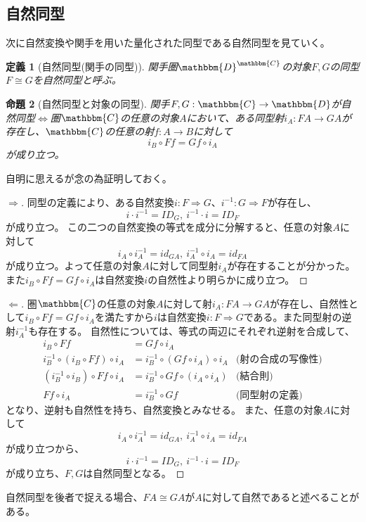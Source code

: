 \documentclass[uplatex,dvipdfmx]{jsarticle}
\newcommand{\cat}[1]{\mathbbm{#1}}
\newcommand{\arrow}{\rightarrow}
\newcommand{\functor}[3]{#1:\cat{#2}\arrow \cat{#3}}
\newcommand{\nat}[3]{#1:#2\Rightarrow #3}
\newcommand{\mor}[3]{#1:#2\arrow #3}
\newcommand{\funccat}[2]{\cat{#2}^\cat{#1}}
\newtheorem{proof}{証明}[section]
\newtheorem{prop}[proof]{命題}
\newtheorem{define}[proof]{定義}
\numberwithin{proof}{subsection}
\begin{document}
	\subsection{自然同型}
  次に自然変換や関手を用いた量化された同型である自然同型を見ていく。
  \begin{define}[自然同型(関手の同型)]
    関手圏$\funccat{C}{D}$の対象$F,G$の同型$F\cong G$を自然同型と呼ぶ。
  \end{define}
  \begin{prop}[自然同型と対象の同型]
    関手$\functor{F,G}{C}{D}$が自然同型$\iff$圏$\cat{C}$の任意の対象$A$において、ある同型射$\mor{i_A}{FA}{GA}$が存在し、$\cat{C}$の任意の射$\mor{f}{A}{B}$に対して\[i_B\circ Ff=Gf\circ i_A\]が成り立つ。
  \end{prop}
  自明に思えるが念の為証明しておく。
  \begin{proof}[$\Longrightarrow$]
    同型の定義により、ある自然変換$\nat{i}{F}{G}$、$\nat{i^{-1}}{G}{F}$が存在し、\[i\cdot i^{-1}=ID_G,\ i^{-1}\cdot i=ID_F\]が成り立つ。
    この二つの自然変換の等式を成分に分解すると、任意の対象$A$に対して\[i_A\circ i^{-1}_A=id_{GA},\ i^{-1}_A\circ i_A=id_{FA}\]が成り立つ。よって任意の対象$A$に対して同型射$i_A$が存在することが分かった。
    また$i_B\circ Ff=Gf\circ i_A$は自然変換$i$の自然性より明らかに成り立つ。
  \end{proof}
  \begin{proof}[$\Longleftarrow$]
    圏$\cat{C}$の任意の対象$A$に対して射$\mor{i_A}{FA}{GA}$が存在し、自然性として$i_B\circ Ff=Gf\circ i_A$を満たすから$i$は自然変換$\nat{i}{F}{G}$である。また同型射の逆射$i^{-1}_A$も存在する。
    自然性については、等式の両辺にそれぞれ逆射を合成して、
    \begin{align*}
      i_B\circ Ff &=Gf\circ i_A\\
      i^{-1}_B\circ (i_B\circ Ff)\circ i_A &=i^{-1}_B\circ(Gf\circ i_A)\circ i_A&\text{(射の合成の写像性)}\\
      (i^{-1}_B\circ i_B)\circ Ff\circ i_A &=i^{-1}_B\circ Gf\circ (i_A\circ i_A)&\text{(結合則)}\\
      Ff\circ i_A&=i^{-1}_B\circ Gf&\text{(同型射の定義)}
    \end{align*}
    となり、逆射も自然性を持ち、自然変換とみなせる。
    また、任意の対象$A$に対して\[i_A\circ i^{-1}_A=id_{GA},\ i^{-1}_A\circ i_A=id_{FA}\]が成り立つから、\[i\cdot i^{-1}=ID_G,\ i^{-1}\cdot i=ID_F\]が成り立ち、$F,G$は自然同型となる。
  \end{proof}
  自然同型を後者で捉える場合、$FA\cong GA$が$A$に対して自然であると述べることがある。
\end{document}

